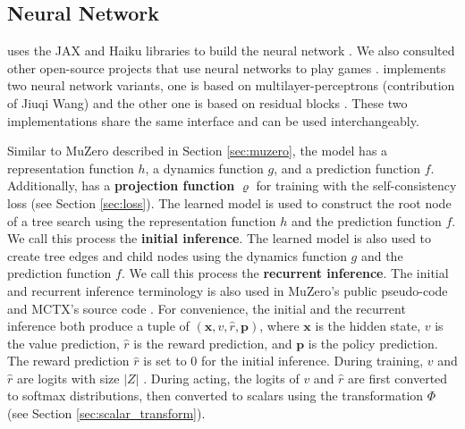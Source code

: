 \subsection{\moozi Neural Network} \label{sec:nn}
\moozi uses the JAX and Haiku libraries to build the neural network \cite{HaikuSonnetJAX_Hennigan.Cai.ea_2020,CompilingMachineLearning_Frostig.Johnson.ea_2018,JAXComposableTransformations_JamesBradbury.RoyFrostig.ea_2018}.
We also consulted other open-source projects that use neural networks to play games \cite{MuZeroGeneral_Duvaud.AureleHainaut_2022, MasteringAtariGames_Ye.Liu.ea_2021, AcceleratingSelfPlayLearning_Wu_2020}.
\moozi implements two neural network variants, one is based on multilayer-perceptrons (contribution of Jiuqi Wang) and the other one is based on residual blocks \cite{DeepResidualLearning_He.Zhang.ea_2016}.
These two implementations share the same interface and can be used interchangeably.

Similar to MuZero described in Section \ref{sec:muzero}, the model has a representation function $h$, a dynamics function $g$, and a prediction function $f$.
Additionally, \moozi has a \textbf{projection function} $\varrho$ for training with the self-consistency loss (see Section \ref{sec:loss}).
The learned model is used to construct the root node of a tree search using the representation function $h$ and the prediction function $f$.
We call this process the \textbf{initial inference}.
The learned model is also used to create tree edges and child nodes using the dynamics function $g$ and the prediction function $f$.
We call this process the \textbf{recurrent inference}.
The initial and recurrent inference terminology is also used in MuZero's public pseudo-code and MCTX's source code \cite{MasteringChessShogi_Silver.Hubert.ea_2017,MctxMCTSinJAX_IvoDanihelka_2022}.
For convenience, the initial and the recurrent inference both produce a tuple of $(\mathbf{x}, v, \hat{r}, \mathbf{p})$, where $\mathbf{x}$ is the hidden state, $v$ is the value prediction, $\hat{r}$ is the reward prediction, and $\mathbf{p}$ is the policy prediction.
The reward prediction $\hat{r}$ is set to 0 for the initial inference.
During training, $v$ and $\hat{r}$ are logits with size $|Z|$ .
During acting, the logits of $v$ and $\hat{r}$ are first converted to softmax distributions, then converted to scalars using the transformation $\Phi$ (see Section \ref{sec:scalar_transform}).

